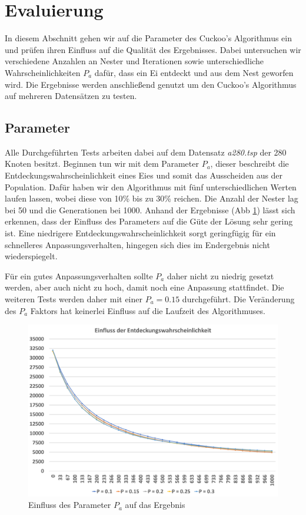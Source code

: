 \documentclass[conference]{IEEEtran}
\begin{document}
  \section{Evaluierung}
    In diesem Abschnitt gehen wir auf die Parameter des Cuckoo's Algorithmus ein und prüfen ihren Einfluss auf die Qualität des Ergebnisses.
    Dabei untersuchen wir verschiedene Anzahlen an Nester und Iterationen sowie unterschiedliche Wahrscheinlichkeiten $P_a$ dafür, dass ein Ei entdeckt 
    und aus dem Nest geworfen wird. Die Ergebnisse werden anschließend genutzt um den Cuckoo's Algorithmus auf mehreren 
    Datensätzen zu testen.


    \subsection{Parameter}
      Alle Durchgeführten Tests arbeiten dabei auf dem Datensatz \emph{a280.tsp} der 280 Knoten besitzt. 
      Beginnen tun wir mit dem Parameter $P_a$, dieser beschreibt die Entdeckungswahrscheinlichkeit eines Eies und somit das Ausscheiden aus der Population. 
      Dafür haben wir den Algorithmus mit fünf unterschiedlichen Werten laufen lassen, wobei diese von 10\% bis zu 30\% reichen. 
      Die Anzahl der Nester lag bei 50 und die Generationen bei 1000. 
      Anhand der Ergebnisse (Abb \ref{fig:pa}) lässt sich erkennen, dass der Einfluss des Parameters auf die Güte der Lösung sehr gering ist. Eine 
      niedrigere Entdeckungswahrscheinlichkeit sorgt geringfügig für ein schnelleres Anpassungsverhalten, hingegen sich dies im Endergebnis nicht wiederspiegelt. 
      
     

      Für ein gutes Anpassungsverhalten sollte $P_a$ daher nicht zu niedrig gesetzt werden, aber auch nicht zu hoch, damit noch eine Anpassung stattfindet. 
      Die weiteren Tests werden daher mit einer $P_a = 0.15$ durchgeführt.
      Die Veränderung des $P_a$ Faktors hat keinerlei Einfluss auf die Laufzeit des Algorithmuses.

      \begin{figure}[h]
        \centering
        \includegraphics[width=1\linewidth]{Entdeckungswahrscheinlichkeit.png}
        \caption{Einfluss des Parameter $P_a$ auf das Ergebnis}
        \label{fig:pa}
      \end{figure}
      
\end{document}
